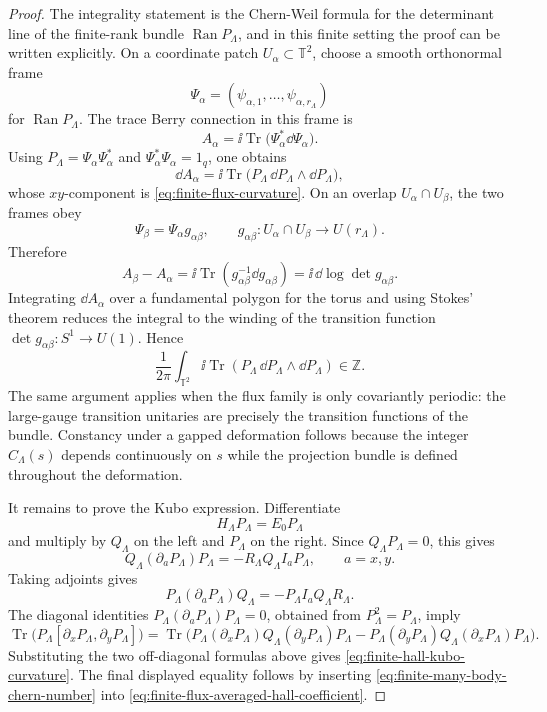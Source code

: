 \begin{proof}
The integrality statement is the Chern-Weil formula for the determinant line
of the finite-rank bundle \(\operatorname{Ran}P_\Lambda\), and in this finite
setting the proof can be written explicitly.  On a coordinate patch
\(U_\alpha\subset\mathbb T^2\), choose a smooth orthonormal frame
\[
  \Psi_\alpha=(\psi_{\alpha,1},\ldots,\psi_{\alpha,r_\Lambda})
\]
for \(\operatorname{Ran}P_\Lambda\).  The trace Berry connection in this
frame is
\[
  A_\alpha
  =
  \ii\operatorname{Tr}\bigl(\Psi_\alpha^*\dd\Psi_\alpha\bigr).
\]
Using \(P_\Lambda=\Psi_\alpha\Psi_\alpha^*\) and
\(\Psi_\alpha^*\Psi_\alpha=1_q\), one obtains
\[
  \dd A_\alpha
  =
  \ii\operatorname{Tr}
  \bigl(P_\Lambda\,\dd P_\Lambda\wedge\dd P_\Lambda\bigr),
\]
whose \(xy\)-component is
\eqref{eq:finite-flux-curvature}.  On an overlap
\(U_\alpha\cap U_\beta\), the two frames obey
\[
  \Psi_\beta=\Psi_\alpha g_{\alpha\beta},
  \qquad g_{\alpha\beta}:U_\alpha\cap U_\beta\to U(r_\Lambda).
\]
Therefore
\[
  A_\beta-A_\alpha
  =
  \ii\operatorname{Tr}(g_{\alpha\beta}^{-1}\dd g_{\alpha\beta})
  =
  \ii\,\dd\log\det g_{\alpha\beta}.
\]
Integrating \(\dd A_\alpha\) over a fundamental polygon for the torus and
using Stokes' theorem reduces the integral to the winding of the transition
function \(\det g_{\alpha\beta}:S^1\to U(1)\).  Hence
\[
  \frac{1}{2\pi}\int_{\mathbb T^2}
  \ii\operatorname{Tr}(P_\Lambda\,\dd P_\Lambda\wedge\dd P_\Lambda)
  \in\mathbb Z .
\]
The same argument applies when the flux family is only covariantly periodic:
the large-gauge transition unitaries are precisely the transition functions
of the bundle.  Constancy under a gapped deformation follows because the
integer \(C_\Lambda(s)\) depends continuously on \(s\) while the projection
bundle is defined throughout the deformation.

It remains to prove the Kubo expression.  Differentiate
\[
  H_\Lambda P_\Lambda=E_0P_\Lambda
\]
and multiply by \(Q_\Lambda\) on the left and \(P_\Lambda\) on the right.
Since \(Q_\Lambda P_\Lambda=0\), this gives
\[
  Q_\Lambda(\partial_aP_\Lambda)P_\Lambda
  =
  -R_\Lambda Q_\Lambda I_aP_\Lambda,
  \qquad a=x,y.
\]
Taking adjoints gives
\[
  P_\Lambda(\partial_aP_\Lambda)Q_\Lambda
  =
  -P_\Lambda I_aQ_\Lambda R_\Lambda .
\]
The diagonal identities \(P_\Lambda(\partial_aP_\Lambda)P_\Lambda=0\),
obtained from \(P_\Lambda^2=P_\Lambda\), imply
\[
  \operatorname{Tr}
  \bigl(P_\Lambda[\partial_xP_\Lambda,\partial_yP_\Lambda]\bigr)
  =
  \operatorname{Tr}
  \bigl(P_\Lambda(\partial_xP_\Lambda)Q_\Lambda(\partial_yP_\Lambda)P_\Lambda
  -
  P_\Lambda(\partial_yP_\Lambda)Q_\Lambda(\partial_xP_\Lambda)P_\Lambda
  \bigr).
\]
Substituting the two off-diagonal formulas above gives
\eqref{eq:finite-hall-kubo-curvature}.  The final displayed equality follows
by inserting \eqref{eq:finite-many-body-chern-number} into
\eqref{eq:finite-flux-averaged-hall-coefficient}.
\end{proof}

